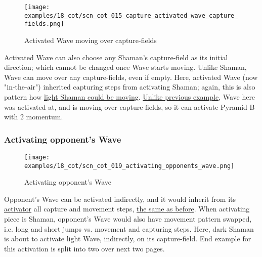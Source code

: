 \clearpage %

\vspace*{-2.3\baselineskip}
\noindent
\begin{figure}[!h]
\texttt{[image: examples/18\_cot/scn\_cot\_015\_capture\_activated\_wave\_capture\_fields.png]}
\vspace*{-1.4\baselineskip}
\caption{Activated Wave moving over capture-fields}
\label{fig:scn_cot_015_capture_activated_wave_capture_fields}
\end{figure}

\vspace*{-0.5\baselineskip}
Activated Wave can also choose any Shaman's capture-field as its initial direction;
which cannot be changed once Wave starts moving. Unlike Shaman, Wave can move over
any capture-fields, even if empty.\newline
\indent
Here, activated Wave (now "in-the-air") inherited capturing steps from activating
Shaman; again, this is also pattern how
\hyperref[fig:scn_cot_004_light_shaman_capture_ply]{light Shaman could be moving}.
\hyperref[fig:scn_cot_012_step_activated_wave_capture_fields]{Unlike previous example},
Wave here was activated at, and is moving over capture-fields, so it can activate
Pyramid B with 2 momentum.

\clearpage %

\subsubsection*{Activating opponent's Wave}
\label{sec:Conquest of Tlalocan/Shaman/Movement/Activating opponent's Wave}

\vspace*{-1.4\baselineskip}
\noindent
\begin{figure}[!h]
\texttt{[image: examples/18\_cot/scn\_cot\_019\_activating\_opponents\_wave.png]}
\vspace*{-1.4\baselineskip}
\caption{Activating opponent's Wave}
\label{fig:scn_cot_019_activating_opponents_wave}
\end{figure}

\vspace*{-0.5\baselineskip}
Opponent's Wave can be activated indirectly, and it would inherit from its
\hyperref[sec:Terms/Activator]{activator} all capture and movement steps,
\hyperref[fig:scn_n_20_activating_opponents_wave]{the same as before}. When
activating piece is Shaman, opponent's Wave would also have movement pattern
swapped, i.e. long and short jumps vs. movement and capturing steps.\newline
\indent
Here, dark Shaman is about to activate light Wave, indirectly, on its capture-field.
End example for this activation is split into two over next two pages.

